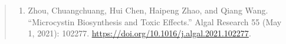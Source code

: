 \documentclass[]{article}
\providecommand{\tightlist}{%
\setlength{\itemsep}{0pt}\setlength{\parskip}{0pt}}
\begin{document}
\begin{quote}
\begin{enumerate}
\def\labelenumi{\arabic{enumi}.}
\setcounter{enumi}{2}
\tightlist
\item
  Zhou, Chuangchuang, Hui Chen, Haipeng Zhao, and Qiang Wang.
  ``Microcystin Biosynthesis and Toxic Effects.'' Algal Research 55 (May
  1, 2021): 102277. \url{https://doi.org/10.1016/j.algal.2021.102277}.
\end{enumerate}
\end{quote}

\vspace{-2pc}
\setlength{\parindent}{-0.5in}
\setlength{\leftskip}{-1in}
\setlength{\parskip}{8pt}

\noindent
\end{document}
